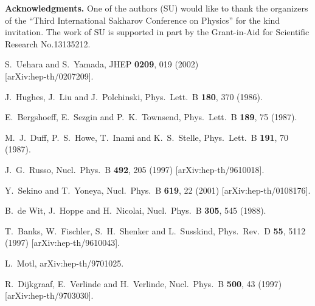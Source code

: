 \documentclass[a4paper,12pt]{article}
\begin{document}
\vspace{\baselineskip}
\noindent
\textbf{Acknowledgments.}
One of the authors (SU) would like to thank the organizers of the
``Third International Sakharov Conference on Physics'' for the kind
invitation. The work of SU is supported in part by the Grant-in-Aid
for Scientific Research No.13135212.

\begin{thebibliography}{99}
S.~Uehara and S.~Yamada,
	JHEP {\bf 0209}, 019 (2002)\\{} [arXiv:hep-th/0207209].

J.~Hughes, J.~Liu and J.~Polchinski,
	Phys.\ Lett.\ B {\bf 180}, 370 (1986).

E.~Bergshoeff, E.~Sezgin and P.~K.~Townsend,
	Phys.\ Lett.\ B {\bf 189}, 75 (1987).

M.~J.~Duff, P.~S.~Howe, T.~Inami and K.~S.~Stelle,
	Phys.\ Lett.\ B {\bf 191}, 70 (1987).

J.~G.~Russo,
	Nucl.\ Phys.\ B {\bf 492}, 205 (1997)
	[arXiv:hep-th/9610018].

Y.~Sekino and T.~Yoneya,
	Nucl.\ Phys.\ B {\bf 619}, 22 (2001)
	[arXiv:hep-th/0108176].

B.~de Wit, J.~Hoppe and H.~Nicolai,
	Nucl.\ Phys.\ B {\bf 305}, 545 (1988).

T.~Banks, W.~Fischler, S.~H.~Shenker and L.~Susskind,
	Phys.\ Rev.\ D {\bf 55}, 5112 (1997)
	[arXiv:hep-th/9610043].

L.~Motl,
	arXiv:hep-th/9701025.

R.~Dijkgraaf, E.~Verlinde and H.~Verlinde,
	Nucl.\ Phys.\ B {\bf 500}, 43 (1997)
	[arXiv:hep-th/9703030].


\end{thebibliography}
\end{document}
